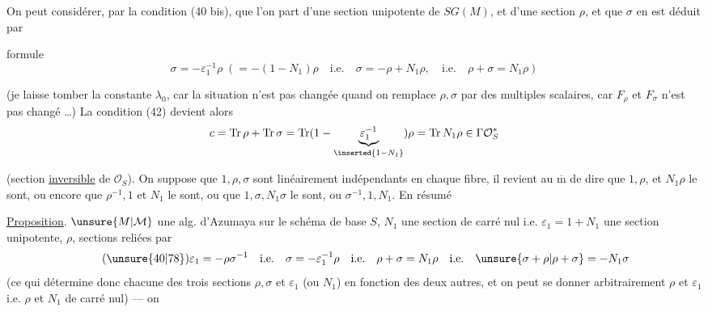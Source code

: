 \uline{} On peut considérer, par la condition (40 bis), que l'on part d'une section   unipotente de $SG(M)$, et d'une section $\rho$, et que $\sigma$ en est déduit par 


formule
\[
\tag{77}
\sigma=-\varepsilon_1^{-1}\rho\;\left(=-(1-N_1)\rho\quad\mathrm{i.e.}\quad\sigma=-\rho+N_1\rho,\quad\mathrm{i.e.}\quad\rho+\sigma=N_1\rho\right)
\]


(je laisse tomber la constante  $\lambda_0$, car  la situation n'est pas changée quand on remplace $\rho,\sigma$ par des multiples scalaires, car $F_\rho$ et $F_\sigma$ n'est pas changé \ldots) La condition (42) devient alors
\[
c=\operatorname{Tr}\rho+\operatorname{Tr}\sigma=\operatorname{Tr}(1-\underbrace{\varepsilon_1^{-1}}_{\inserted{1-N_1}})\rho=\operatorname{Tr}N_1\rho\in\Gamma\mathcal O_S^*
\]


(section \uline{inversible} de $\mathcal O_S$). On suppose que $1,\rho,\sigma$ sont linéairement indépendants en chaque fibre, il revient au $\overline{\mathrm m}$ de dire que $1,\rho$, et $N_1\rho$ le sont, ou encore que $\rho^{-1},1$ et $N_1$ le sont, ou que $1,\sigma,N_1\sigma$ le sont, ou $\sigma^{-1},1,N_1$. En résumé


\uline{Proposition}.  $\unsure{M|\mathcal M}$ une alg. d'Azumaya sur le schéma de base $S$, $N_1$ une section de carré nul  i.e. $\varepsilon_1=1+N_1$ une section unipotente, $\rho$, \inserted{$\sigma$}   sections reliées par
\[
\tag{\unsure{40|78}}
\varepsilon_1=-\rho\sigma^{-1}\quad\mathrm{i.e.}\quad\sigma=-\varepsilon_1^{-1}\rho\quad\mathrm{i.e.}\quad\rho+\sigma=N_1\rho\quad\mathrm{i.e.}\quad\unsure{\sigma+\rho|\rho+\sigma}=-N_1\sigma
\]
 (ce qui détermine donc chacune des trois sections  $\rho,\sigma$ et $\varepsilon_1$ (ou $N_1$) en fonction des deux autres, et on peut se donner arbitrairement $\rho$ et  $\varepsilon_1$ i.e. $\rho$ et $N_1$ de carré nul) --- on
